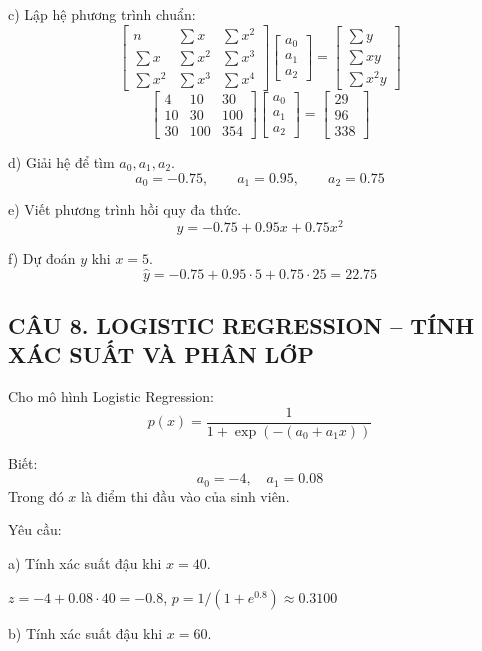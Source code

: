 \documentclass[a4paper,12pt]{article}
\begin{document}
c) Lập hệ phương trình chuẩn:
\[ \begin{bmatrix}
n & \sum x & \sum x^2 \\
\sum x & \sum x^2 & \sum x^3 \\
\sum x^2 & \sum x^3 & \sum x^4
\end{bmatrix}
\begin{bmatrix} a_0 \\ a_1 \\ a_2 \end{bmatrix} =
\begin{bmatrix} \sum y \\ \sum xy \\ \sum x^2 y \end{bmatrix} \]
\[ \begin{bmatrix}
4 & 10 & 30 \\
10 & 30 & 100 \\
30 & 100 & 354
\end{bmatrix}
\begin{bmatrix} a_0 \\ a_1 \\ a_2 \end{bmatrix} =
\begin{bmatrix} 29 \\ 96 \\ 338 \end{bmatrix} \]

d) Giải hệ để tìm $a_0, a_1, a_2$.
\[ a_0 = -0.75, \qquad a_1 = 0.95, \qquad a_2 = 0.75 \]

e) Viết phương trình hồi quy đa thức.
\[ y = -0.75 + 0.95x + 0.75x^2 \]

f) Dự đoán $y$ khi $x = 5$.
\[ \hat{y} = -0.75 + 0.95 \cdot 5 + 0.75 \cdot 25 = 22.75 \]

\subsection*{CÂU 8. LOGISTIC REGRESSION -- TÍNH XÁC SUẤT VÀ PHÂN LỚP}

Cho mô hình Logistic Regression:
\[ p(x) = \frac{1}{1 + \exp(-(a_0 + a_1 x))} \]

Biết:
\[ a_0 = -4, \quad a_1 = 0.08 \]
Trong đó $x$ là điểm thi đầu vào của sinh viên.

Yêu cầu:

a) Tính xác suất đậu khi $x = 40$.

$z = -4 + 0.08 \cdot 40 = -0.8$, $p = 1/(1 + e^{0.8}) \approx 0.3100$

b) Tính xác suất đậu khi $x = 60$.
\end{document}
